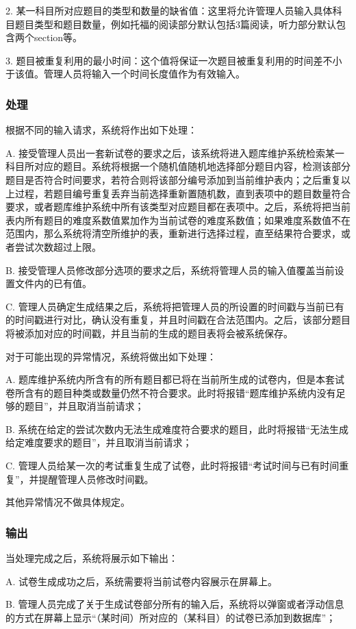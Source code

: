 	2. 某一科目所对应题目的类型和数量的缺省值：这里将允许管理人员输入具体科目题目类型和题目数量，例如托福的阅读部分默认包括3篇阅读，听力部分默认包含两个section等。

	3. 题目被重复利用的最小时间：这个值将保证一次题目被重复利用的时间差不小于该值。管理人员将输入一个时间长度值作为有效输入。

\subsubsection{处理}
根据不同的输入请求，系统将作出如下处理：

A. 接受管理人员出一套新试卷的要求之后，该系统将进入题库维护系统检索某一科目所对应的题目。系统将根据一个随机值随机地选择部分题目内容，检测该部分题目是否符合时间要求，若符合则将该部分编号添加到当前维护表内；之后重复以上过程，若题目编号重复丢弃当前选择重新置随机数，直到表项中的题目数量符合要求，或者题库维护系统中所有该类型对应题目都在表项中。之后，系统将把当前表内所有题目的难度系数值累加作为当前试卷的难度系数值；如果难度系数值不在范围内，那么系统将清空所维护的表，重新进行选择过程，直至结果符合要求，或者尝试次数超过上限。

B. 接受管理人员修改部分选项的要求之后，系统将管理人员的输入值覆盖当前设置文件内的已有值。

C. 管理人员确定生成结果之后，系统将把管理人员的所设置的时间戳与当前已有的时间戳进行对比，确认没有重复，并且时间戳在合法范围内。之后，该部分题目将被添加对应的时间戳，并且当前的生成的题目表将会被系统保存。

对于可能出现的异常情况，系统将做出如下处理：

A. 题库维护系统内所含有的所有题目都已将在当前所生成的试卷内，但是本套试卷所含有的题目种类或数量仍然不符合要求。此时将报错“题库维护系统内没有足够的题目”，并且取消当前请求；

B. 系统在给定的尝试次数内无法生成难度符合要求的题目，此时将报错“无法生成给定难度要求的题目”，并且取消当前请求；

C. 管理人员给某一次的考试重复生成了试卷，此时将报错“考试时间与已有时间重复”，并提醒管理人员修改时间戳。

其他异常情况不做具体规定。

\subsubsection{输出}
当处理完成之后，系统将展示如下输出：

A. 试卷生成成功之后，系统需要将当前试卷内容展示在屏幕上。

B. 管理人员完成了关于生成试卷部分所有的输入后，系统将以弹窗或者浮动信息的方式在屏幕上显示“（某时间）所对应的（某科目）的试卷已添加到数据库”；

